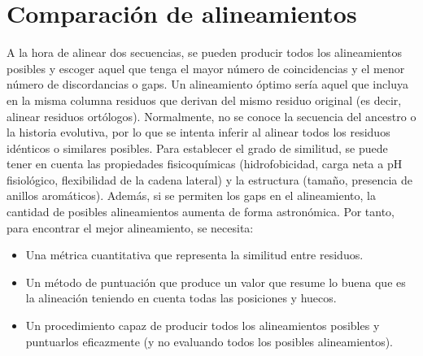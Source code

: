 \section{Comparación de alineamientos}
A la hora de alinear dos secuencias, se pueden producir todos los alineamientos posibles y escoger aquel que tenga el mayor número de coincidencias y el menor número de discordancias o gaps. Un alineamiento óptimo sería aquel que incluya en la misma columna residuos que derivan del mismo residuo original (es decir, alinear residuos ortólogos). Normalmente, no se conoce la secuencia del ancestro o la historia evolutiva, por lo que se intenta inferir al alinear todos los residuos idénticos o similares posibles. Para establecer el grado de similitud, se puede tener en cuenta las propiedades fisicoquímicas (hidrofobicidad, carga neta a pH fisiológico, flexibilidad de la cadena lateral) y la estructura (tamaño, presencia de anillos aromáticos). Además, si se permiten los gaps en el alineamiento, la cantidad de posibles alineamientos aumenta de forma astronómica. Por tanto, para encontrar el mejor alineamiento, se necesita:
\begin{itemize}
\item Una métrica cuantitativa que representa la similitud entre residuos.
\item Un método de puntuación que produce un valor que resume lo buena que es la alineación teniendo en cuenta todas las posiciones y huecos.
\item Un procedimiento capaz de producir todos los alineamientos posibles y puntuarlos eficazmente (y no evaluando todos los posibles alineamientos).
\end{itemize}

